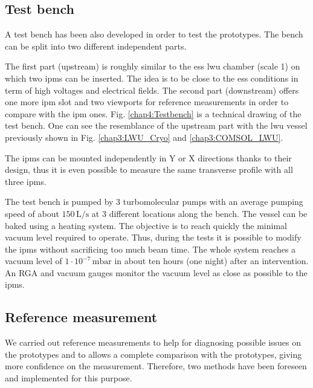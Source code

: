 \begin{refsection}

  

  \subsection{Test bench}
  A test bench has been also developed in order to test the prototypes. The bench can be split into two different independent parts.

  The first part (upstream) is roughly similar to the \acrshort{ess} \acrshort{lwu} chamber (scale 1) on which two \acrshort{ipm}s can be inserted. The idea is to be close to the \acrshort{ess} conditions in term of high voltages and electrical fields. The second part (downstream) offers one more \acrshort{ipm} slot and two viewports for reference measurements in order to compare with the \acrshort{ipm} ones. Fig. \ref{chap4:Testbench} is a technical drawing of the test bench. One can see the resemblance of the upstream part with the \acrshort{lwu} vessel previously shown in Fig. \ref{chap3:LWU_Cryo} and \ref{chap3:COMSOL_LWU}.


  The \acrshort{ipm}s can be mounted independently in Y or X directions thanks to their design, thus it is even possible to measure the same transverse profile with all three \acrshort{ipm}s.

  

  The test bench is pumped by 3 turbomolecular pumps with an average pumping speed of about $150\,\mathrm{L/s}$ at 3 different locations along the bench. The vessel can be baked using a heating system. The objective is to reach quickly the minimal vacuum level required to operate. Thus, during the tests it is possible to modify the \acrshort{ipm}s without sacrificing too much beam time. The whole system reaches a vacuum level of $1\cdot 10^{-7}\,\mathrm{mbar}$ in about ten hours (one night) after an intervention. An RGA and vacuum gauges monitor the vacuum level as close as possible to the \acrshort{ipm}s.

  \subsection{Reference measurement}
  \label{chap4:sec:ref}
  We carried out reference measurements to help for diagnosing possible issues on the prototypes and to allows a complete comparison with the prototypes, giving more confidence on the measurement. Therefore, two methods have been foreseen and implemented for this purpose.


\end{refsection}
